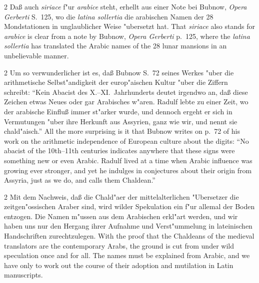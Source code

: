 \documentclass[10pt,a4paper]{article}
\renewcommand{\switchcolumn}{\syncronize\nointerlineskip\columnbreak}
\newcommand{\enquote}[1]{``#1''}
\begin{document}
\begin{paracol}{2}
Da\ss{} auch \textit{siriace} f"ur \textit{arabice} steht, erhellt aus einer Note bei Bubnow, \textit{Opera Gerberti} S.\ 125, wo die \textit{latina sollertia} die arabischen Namen der 28 Mondstationen in unglaublicher Weise "ubersetzt hat.
\switchcolumn
That \textit{siriace} also stands for \textit{arabice} is clear from a note by Bubnow, \textit{Opera Gerberti} p.\ 125, where the \textit{latina sollertia} has translated the Arabic names of the 28 lunar mansions in an unbelievable manner.
\end{paracol}

\begin{paracol}{2}
Um so verwunderlicher ist es, da\ss{} Bubnow S.\ 72 seines Werkes "uber die arithmetische Selbst"andigkeit der europ"aischen Kultur "uber die Ziffern schreibt: \enquote{Kein Abacist des X.--XI.\ Jahrhunderts deutet irgendwo an, da\ss{} diese Zeichen etwas Neues oder gar Arabisches w"aren. Radulf lebte zu einer Zeit, wo der arabische Einflu\ss{} immer st"arker wurde, und dennoch ergeht er sich in Vermutungen "uber ihre Herkunft aus Assyrien, ganz wie wir, und nennt sie chald"aisch.}
\switchcolumn
All the more surprising is it that Bubnow writes on p.\ 72 of his work on the arithmetic independence of European culture about the digits: ``No abacist of the 10th--11th centuries indicates anywhere that these signs were something new or even Arabic. Radulf lived at a time when Arabic influence was growing ever stronger, and yet he indulges in conjectures about their origin from Assyria, just as we do, and calls them Chaldean.''
\end{paracol}

\begin{paracol}{2}
Mit dem Nachweis, da\ss{} die Chald"aer der mittelalterlichen "Ubersetzer die zeitgen"ossischen Araber sind, wird wilder Spekulation ein f"ur allemal der Boden entzogen. Die Namen m"ussen aus dem Arabischen erkl"art werden, und wir haben uns nur den Hergang ihrer Aufnahme und Verst"ummelung in lateinischen Handschriften zurechtzulegen.
\switchcolumn
With the proof that the Chaldeans of the medieval translators are the contemporary Arabs, the ground is cut from under wild speculation once and for all. The names must be explained from Arabic, and we have only to work out the course of their adoption and mutilation in Latin manuscripts.
\end{paracol}
\end{document}
